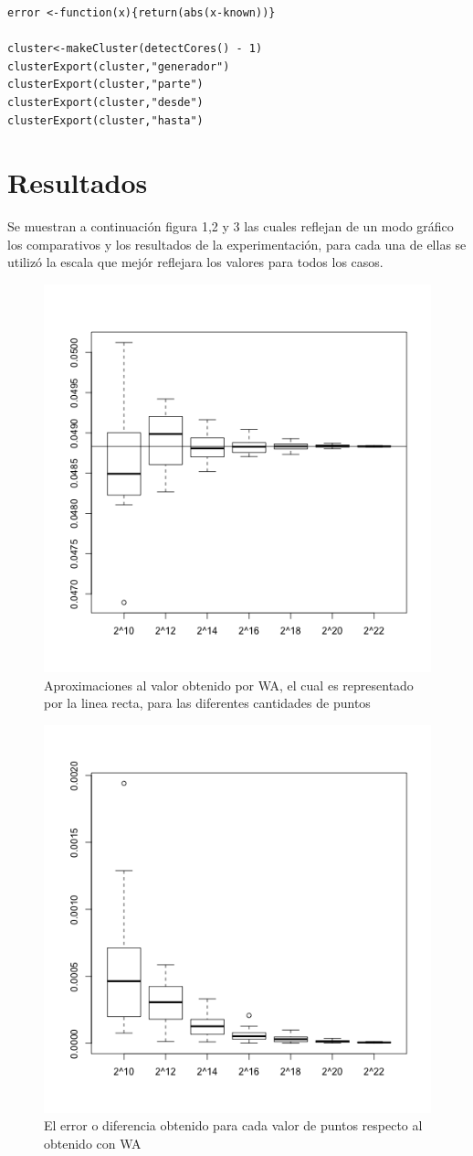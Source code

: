 \documentclass[a4paper]{article}
\begin{document}
\begin{lstlisting}[frame=single]
error <-function(x){return(abs(x-known))}

cluster<-makeCluster(detectCores() - 1)
clusterExport(cluster,"generador")
clusterExport(cluster,"parte")
clusterExport(cluster,"desde")
clusterExport(cluster,"hasta")
\end{lstlisting}


\section{Resultados}
Se muestran a continuación figura 1,2 y 3 las cuales reflejan de un modo gráfico los comparativos y los resultados de la experimentación, para cada una de ellas se utilizó la escala que mejór reflejara los valores para todos los casos.


\begin{figure}[!]
\centering
\includegraphics[width=0.7\linewidth]{aprox}
\caption{Aproximaciones al valor obtenido por WA, el cual es representado por la linea recta, para las diferentes cantidades de puntos}
\label{fig:aprox}
\end{figure}

\begin{figure}[!]
\centering
\includegraphics[width=0.7\linewidth]{error}
\caption{El error o diferencia obtenido para cada valor de puntos respecto al obtenido con WA}
\label{fig:error}
\end{figure}
\end{document}
